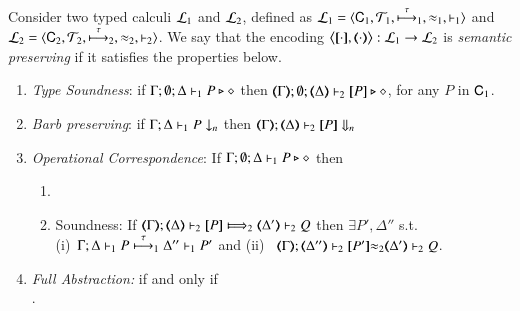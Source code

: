 \begin{definition}%
\label{def:ep}
       Consider two typed calculi $\tyl{L}_1$ and  $\tyl{L}_2$, defined as 
        $\tyl{L}_1=\calc{\CAL_1}{{\cal{T}}_1}{\hby{\tau}_1}{\wb_1}{\proves_1}$
       and $\tyl{L}_2=\calc{\CAL_2}{{\cal{T}}_2}{\hby{\tau}_2}{\wb_2}{\proves_2}$.
We say that the encoding $\enco{\map{\cdot}, \mapt{\cdot}}: \tyl{L}_1 \to \tyl{L}_2$ is   \emph{semantic preserving}
if it satisfies the properties below.
	
	\begin{enumerate}[1.]
		\item \emph{Type Soundness}:
	if
	$\Gamma; \emptyset; \Delta \proves_1 P \hastype \Proc$ then 
	$\mapt{\Gamma}; \emptyset; \mapt{\Delta} \proves_2 \map{P} \hastype \Proc$,  
	for any   $P$ in $\CAL_1$.

			\item \emph{Barb preserving}: if $\Gamma; \Delta \proves_1 P \barb{n}$
		then $\mapt{\Gamma}; \mapt{\Delta} \proves_2 \map{P} \Barb{n}$

	\item \emph{Operational Correspondence}: If $\Gamma; \emptyset; \Delta \proves_1 P \hastype \Proc$ then
		\begin{enumerate}
			\item	{}
				
			\item	Soundness:   
				If  $\wtytraargi{\mapt{\Gamma}}{}{\mapt{\Delta}}{\map{P}}{\mapt{\Delta'}}{Q}{2}{2}$
				then  $\exists P', \Delta''$ s.t.  \\
				(i)~$\stytraargi{\Gamma}{\tau}{\Delta}{P}{\Delta''}{P'}{1}{1}$
				and 
				(ii)~
${\mapt{\Gamma}};{\mapt{\Delta''}}\proves_2 {\map{P'}}{\wb_2}
{\mapt{\Delta'}}\proves_2 {Q}$.

		\end{enumerate}
		
		\item \emph{Full Abstraction:} 
		if and only if \\
		.
		
	\end{enumerate}
\end{definition}


